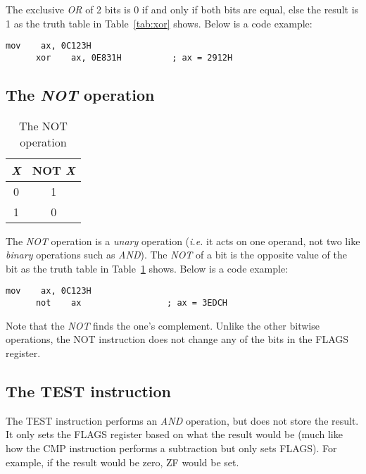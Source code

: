 The exclusive \emph{OR} of 2 bits is 0 if and only if both bits
are equal, else the result is 1 as the truth table in
Table~\ref{tab:xor} shows. Below is a code example:

\begin{lstlisting}[language={[x86masm]Assembler}]
      mov    ax, 0C123H
      xor    ax, 0E831H          ; ax = 2912H
\end{lstlisting}

\subsection{The \emph{NOT} operation}

\begin{table}[t]
\centering
\begin{tabular}{|c|c|}
\hline
\emph{X} & NOT \emph{X} \\
\hline
0 & 1 \\
1 & 0 \\
\hline
\end{tabular}
\caption{The NOT operation \label{tab:not}}
\end{table}

The \emph{NOT} operation is a \emph{unary} operation (\emph{i.e.} it
acts on one operand, not two like \emph{binary} operations such as
\emph{AND}).  The \emph{NOT} of a bit is the opposite value of the bit
as the truth table in Table~\ref{tab:not} shows. Below is a code
example:

\begin{lstlisting}[language={[x86masm]Assembler}]
      mov    ax, 0C123H
      not    ax                 ; ax = 3EDCH
\end{lstlisting}

Note that the \emph{NOT} finds the one's complement. Unlike the other
bitwise operations, the {\code NOT} instruction does not change any of
the bits in the {\code FLAGS} register.

\subsection{The {\code TEST} instruction}

The {\code TEST} instruction performs an \emph{AND} operation, but
does not store the result. It only sets the {\code FLAGS} register
based on what the result would be (much like how the {\code CMP}
instruction performs a subtraction but only sets {\code FLAGS}). For
example, if the result would be zero, {\code ZF} would be set.

